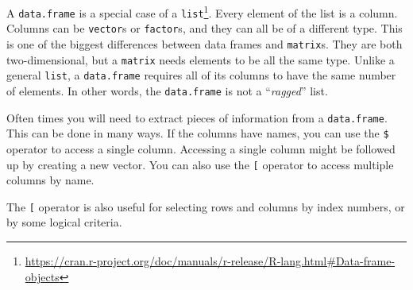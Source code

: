 \documentclass[
  12pt,
]{krantz}
\makeatletter
\newenvironment{Shaded}{\begin{snugshade}}{\end{snugshade}}
\newcommand{\DecValTok}[1]{\textcolor[rgb]{0.06,0.06,0.06}{#1}}
\newcommand{\DocumentationTok}[1]{\textcolor[rgb]{0.37,0.37,0.37}{\textbf{\textit{#1}}}}
\newcommand{\FunctionTok}[1]{\textcolor[rgb]{0,0,0}{#1}}
\newcommand{\NormalTok}[1]{#1}
\newcommand{\OtherTok}[1]{\textcolor[rgb]{0.37,0.37,0.37}{#1}}
\newcommand{\SpecialCharTok}[1]{\textcolor[rgb]{0,0,0}{#1}}
\newcommand{\StringTok}[1]{\textcolor[rgb]{0.5,0.5,0.5}{#1}}
\renewcommand{\href}[2]{#2\footnote{\url{#1}}}
\newenvironment{kframe}{%
\medskip{}
\setlength{\fboxsep}{.8em}
 \def\at@end@of@kframe{}%
 \ifinner\ifhmode%
  \def\at@end@of@kframe{\end{minipage}}%
  \begin{minipage}{\columnwidth}%
 \fi\fi%
 \def\FrameCommand##1{\hskip\@totalleftmargin \hskip-\fboxsep
 \colorbox{shadecolor}{##1}\hskip-\fboxsep
     \hskip-\linewidth \hskip-\@totalleftmargin \hskip\columnwidth}%
 \MakeFramed {\advance\hsize-\width
   \@totalleftmargin\z@ \linewidth\hsize
   \@setminipage}}%
 {\par\unskip\endMakeFramed%
 \at@end@of@kframe}
\renewenvironment{Shaded}{\begin{kframe}}{\end{kframe}}
\makeatother
\begin{document}
\href{https://cran.r-project.org/doc/manuals/r-release/R-lang.html\#Data-frame-objects}{A \texttt{data.frame} is a special case of a \texttt{list}}. Every element of the list is a column. Columns can be \texttt{vector}s or \texttt{factor}s, and they can all be of a different type. This is one of the biggest differences between data frames and \texttt{matrix}s. They are both two-dimensional, but a \texttt{matrix} needs elements to be all the same type. Unlike a general \texttt{list}, a \texttt{data.frame} requires all of its columns to have the same number of elements. In other words, the \texttt{data.frame} is not a ``\emph{ragged}'' list.

Often times you will need to extract pieces of information from a \texttt{data.frame}. This can be done in many ways. If the columns have names, you can use the \texttt{\$} operator to access a single column. Accessing a single column might be followed up by creating a new vector. You can also use the \texttt{{[}} operator to access multiple columns by name.

\begin{Shaded}
\end{Shaded}

The \texttt{{[}} operator is also useful for selecting rows and columns by index numbers, or by some logical criteria.
\end{document}
